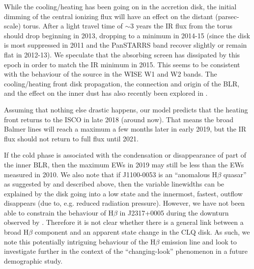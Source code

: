\documentclass[a4paper,fleqn,usenatbib]{mnras}
\begin{document}
While the cooling/heating has been going on in the accretion disk, the
initial dimming of the central ionizing flux will have an effect on
the distant (parsec-scale) torus. After a light travel time of $\sim$3
years the IR flux from the torus should drop \citep{Koshida2014,
Jun2015b} beginning in 2013, dropping to a minimum in 2014-15 (since
the disk is most suppressed in 2011 and the PanSTARRS band recover
slightly or remain flat in 2012-13). We speculate that the absorbing
screen has dissipated by this epoch in order to match the IR minimum
in 2015. This seems to be consistent with the behaviour of the source
in the WISE W1 and W2 bands. The cooling/heating front disk
propagation, the connection and origin of the BLR, and the effect on
the inner dust has also recently been explored in
\citet{Baskin_Laor2018}.

Assuming that nothing else drastic happens, our model predicts that
the heating front returns to the ISCO in late 2018 (around now). That
means the broad Balmer lines will reach a maximum a few months later
in early 2019, but the IR flux should not return to full flux until 2021. 

If the cold phase is associated with the condensation or disappearance
of part of the inner BLR, then the maximum EWs in 2019 may still be
less than the EWs measured in 2010. We also note that if J1100-0053 is
an ``anomalous H$\beta$ quasar'' as suggested by
\citet{Steinhardt_Silverman2013} and described above, then the
variable linewidths can be explained by the disk going into a low
state and the innermost, fastest, outflow disappears (due to,
e.g. reduced radiation pressure). However, we have not been able to
constrain the behaviour of H$\beta$ in J2317+0005 during the downturn
observed by \citep{Guo2016}. Therefore it is not clear whether there
is a general link between a broad H$\beta$ component and an apparent
state change in the CLQ disk. As such, we note this potentially
intriguing behaviour of the H$\beta$ emission line and look to
investigate further in the context of the ``changing-look'' phenomenon
in a future demographic study.
\end{document}
